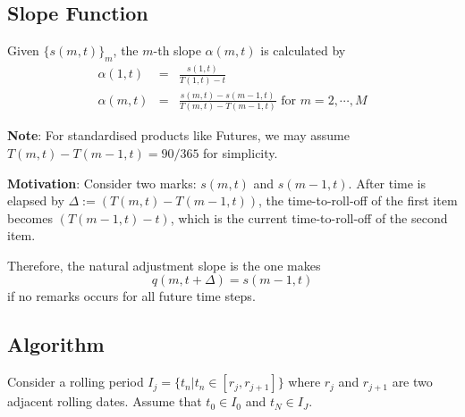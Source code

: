 \documentclass[12pt]{article}
\begin{document}
\subsection{Slope Function}

Given $\{s(m,t)\}_{m}$, the $m$-th slope $\alpha(m, t)$ is calculated by
\begin{eqnarray}
    \alpha(1, t) & = & \frac{s(1,t)}{T(1, t) - t} \\
    \alpha(m, t) & = & \frac{s(m,t) - s(m-1,t)}{T(m,t) - T(m-1,t)} \textrm{ for } m = 2, \cdots, M
\end{eqnarray}

{\bf Note}: For standardised products like Futures, we may assume $T(m, t) - T(m-1, t) = 90/365$ for simplicity. 

{\bf Motivation}: Consider two marks: $s(m,t)$ and $s(m-1,t)$.
After time is elapsed by $\Delta := (T(m,t) - T(m-1,t))$, the time-to-roll-off of the first item becomes $(T(m-1,t)-t)$, which is the current time-to-roll-off of the second item. 

Therefore, the natural adjustment slope is the one makes
$$q(m, t + \Delta) = s(m-1, t)$$
if no remarks occurs for all future time steps. 




\subsection{Algorithm}

Consider a rolling period $I_j = \{t_n| t_n \in [r_j, r_{j+1}]\}$ where $r_j$ and $r_{j+1}$ are two adjacent rolling dates. Assume that $t_0 \in I_0$ and $t_N \in I_J$. 
\end{document}
